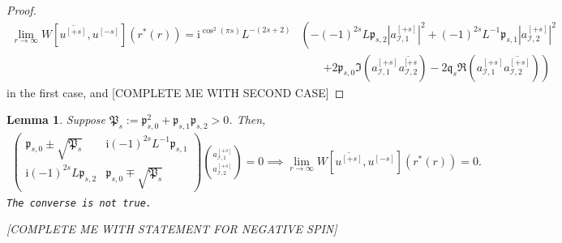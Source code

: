 \documentclass[11pt]{article}
\newtheorem{lemma}[proposition]{Lemma}
\newcommand{\ii}{\mathrm{i}}
\newcommand{\cI}{\mathcal I}
\numberwithin{equation}{section}
\begin{document}
\begin{proof}
\begin{align*}
\lim_{r\to \infty}W[\overline{u^{[+s]}},u^{[-s]}](r^*(r))=\ii^{\cos^2(\pi s)}L^{-(2s+2)}&\left(
-(-1)^{2s}L\mathfrak p_{s,2}|a_{\cI,1}^{[+s]}|^2
+(-1)^{2s} L^{-1}\mathfrak p_{s,1}|a_{\cI,2}^{[+s]}|^2\right.
\\
&\qquad\left.+ 2\mathfrak p_{s,0}\Im(a_{\cI,1}^{[+s]}\overline{a_{\cI,2}^{[+s}})
- 2\mathfrak q_{s}\Re(a_{\cI,1}^{[+s]}\overline{a_{\cI,2}^{[+s]}})
\right)
\end{align*}
in the first case, and [COMPLETE ME WITH SECOND CASE]
\end{proof}

\begin{lemma} Suppose $\mathfrak P_s:=\mathfrak p_{s,0}^2+\mathfrak p_{s,1}\mathfrak p_{s,2}>0$. Then, 
\begin{align*}
\begin{pmatrix}
\mathfrak p_{s,0}\pm\sqrt{\mathfrak P_s}
&
\ii (-1)^{2s }L^{-1}\mathfrak p_{s,1}
\\
\ii (-1)^{2s} L\mathfrak p_{s,2}
&
\mathfrak p_{s,0}\mp\sqrt{\mathfrak P_s}
\end{pmatrix}\binom{a_{\cI,1}^{[+s]}}{a_{\cI,2}^{[+s]}}
=0 \implies \lim_{r\to \infty}W[\overline{u^{[+s]}},u^{[-s]}](r^*(r))=0.
\end{align*}
\texttt{The converse is not true.}

[COMPLETE ME WITH STATEMENT FOR NEGATIVE SPIN]
\end{lemma}
\end{document}
